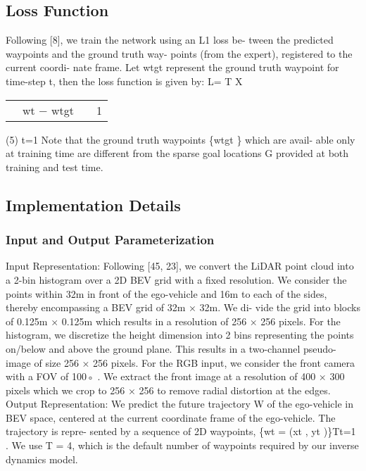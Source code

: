 \documentclass[letterpaper, 12pt]{article}
\theoremstyle{definition}
\theoremstyle{definition}
\theoremstyle{definition}
\theoremstyle{definition}
\theoremstyle{definition}
\begin{document}
\subsection{Loss Function}
\label{sec:org3619825}
Following [8], we train the network using an L1 loss be-
tween the predicted waypoints and the ground truth way-
points (from the expert), registered to the current coordi-
nate frame. Let wtgt represent the ground truth waypoint for time-step t, then the loss function is given by:
L=
T
X
\begin{center}
\begin{tabular}{lllr}
 & wt − wtgt &  & 1\\
\end{tabular}
\end{center}
(5)
t=1
Note that the ground truth waypoints \{wtgt \} which are avail-
able only at training time are different from the sparse goal
locations G provided at both training and test time.
\subsection{Implementation Details}
\label{sec:orgf73ca7b}

\subsubsection{Input and Output Parameterization}
\label{sec:orgded5797}
Input Representation: Following [45, 23], we convert the
LiDAR point cloud into a 2-bin histogram over a 2D BEV
grid with a fixed resolution. We consider the points within
32m in front of the ego-vehicle and 16m to each of the sides,
thereby encompassing a BEV grid of 32m × 32m. We di-
vide the grid into blocks of 0.125m × 0.125m which results
in a resolution of 256 × 256 pixels. For the histogram, we
discretize the height dimension into 2 bins representing the
points on/below and above the ground plane. This results in
a two-channel pseudo-image of size 256 × 256 pixels. For
the RGB input, we consider the front camera with a FOV
of 100◦ . We extract the front image at a resolution of 400
× 300 pixels which we crop to 256 × 256 to remove radial
distortion at the edges.
Output Representation: We predict the future trajectory
W of the ego-vehicle in BEV space, centered at the current
coordinate frame of the ego-vehicle. The trajectory is repre-
sented by a sequence of 2D waypoints, \{wt = (xt , yt )\}Tt=1 .
We use T = 4, which is the default number of waypoints
required by our inverse dynamics model.
\end{document}
